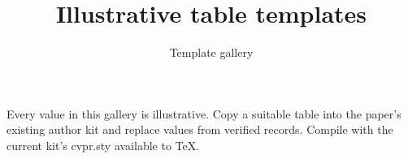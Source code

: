 \documentclass[10pt,twocolumn,letterpaper]{article}
\title{Illustrative table templates}
\author{Template gallery}
\begin{document}
\maketitle
Every value in this gallery is illustrative. Copy a suitable table into the paper's existing author kit and replace values from verified records. Compile with the current kit's cvpr.sty available to TeX.










\clearpage
\end{document}
